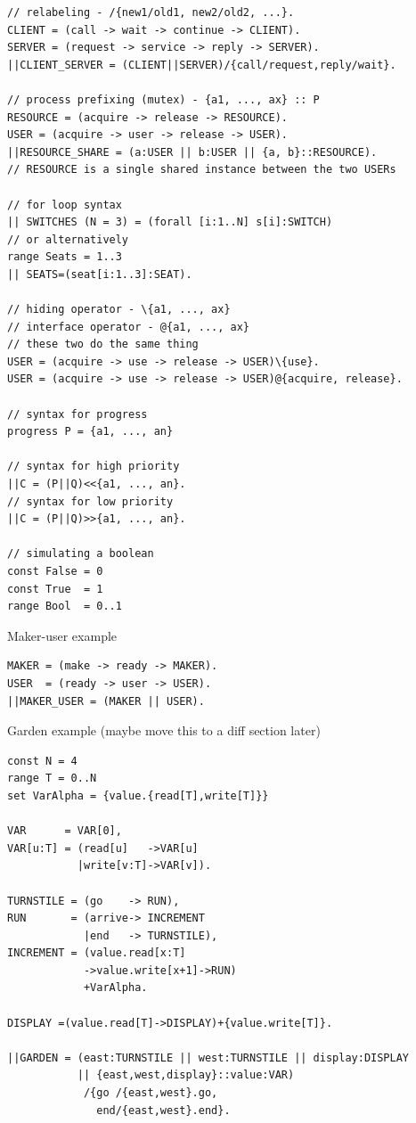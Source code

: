\documentclass[letterpaper, 8pt]{extarticle}
\begin{document}
\begin{multicols*}{5}
\begin{lstlisting}
// relabeling - /{new1/old1, new2/old2, ...}.
CLIENT = (call -> wait -> continue -> CLIENT).
SERVER = (request -> service -> reply -> SERVER).
||CLIENT_SERVER = (CLIENT||SERVER)/{call/request,reply/wait}.

// process prefixing (mutex) - {a1, ..., ax} :: P
RESOURCE = (acquire -> release -> RESOURCE).
USER = (acquire -> user -> release -> USER).
||RESOURCE_SHARE = (a:USER || b:USER || {a, b}::RESOURCE).
// RESOURCE is a single shared instance between the two USERs

// for loop syntax
|| SWITCHES (N = 3) = (forall [i:1..N] s[i]:SWITCH)
// or alternatively
range Seats = 1..3
|| SEATS=(seat[i:1..3]:SEAT).

// hiding operator - \{a1, ..., ax}
// interface operator - @{a1, ..., ax}
// these two do the same thing
USER = (acquire -> use -> release -> USER)\{use}.
USER = (acquire -> use -> release -> USER)@{acquire, release}.

// syntax for progress
progress P = {a1, ..., an}

// syntax for high priority
||C = (P||Q)<<{a1, ..., an}.
// syntax for low priority
||C = (P||Q)>>{a1, ..., an}.

// simulating a boolean
const False = 0
const True  = 1
range Bool  = 0..1
\end{lstlisting}

Maker-user example
\begin{lstlisting}
MAKER = (make -> ready -> MAKER).
USER  = (ready -> user -> USER).
||MAKER_USER = (MAKER || USER).
\end{lstlisting}

Garden example (maybe move this to a diff section later)
\begin{lstlisting}
const N = 4
range T = 0..N
set VarAlpha = {value.{read[T],write[T]}}

VAR      = VAR[0],
VAR[u:T] = (read[u]   ->VAR[u] 
           |write[v:T]->VAR[v]).

TURNSTILE = (go    -> RUN),
RUN       = (arrive-> INCREMENT
            |end   -> TURNSTILE),
INCREMENT = (value.read[x:T]
            ->value.write[x+1]->RUN)
            +VarAlpha.

DISPLAY =(value.read[T]->DISPLAY)+{value.write[T]}.

||GARDEN = (east:TURNSTILE || west:TURNSTILE || display:DISPLAY
           || {east,west,display}::value:VAR)
            /{go /{east,west}.go,
              end/{east,west}.end}.
\end{lstlisting}


\end{multicols*}
\end{document}
